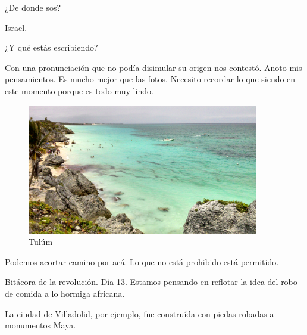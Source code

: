 \documentclass[11pt,twoside,openright,a6paper]{book}
\begin{document}
¿De donde sos?

Israel.

¿Y qué estás escribiendo?

Con una pronunciación que no podía disimular su origen nos contestó. Anoto
mis pensamientos. Es mucho mejor que las fotos. Necesito recordar lo que
siendo en este momento porque es todo muy lindo.

\begin{figure}[H]
  \centering
    \includegraphics[width=0.9\textwidth]{fotos/2013/tulum}
  \caption{Tulúm}
  \label{Tulúm}
\end{figure}


\vspace{0.5cm}
\hrulefill\hspace{0.2cm} \decofourleft\decofourright \hspace{0.2cm} \hrulefill
\vspace{0.5cm}

Podemos acortar camino por acá. Lo que no está prohibido está permitido.


\vspace{0.5cm}
\hrulefill\hspace{0.2cm} \decofourleft\decofourright \hspace{0.2cm} \hrulefill
\vspace{0.5cm}

Bitácora de la revolución. Día 13. Estamos pensando en reflotar la idea
del robo de comida a lo hormiga africana.


\vspace{0.5cm}
\hrulefill\hspace{0.2cm} \decofourleft\decofourright \hspace{0.2cm} \hrulefill
\vspace{0.5cm}

La ciudad de Villadolid, por ejemplo, 
fue construída con piedas robadas a monumentos Maya.
\end{document}
